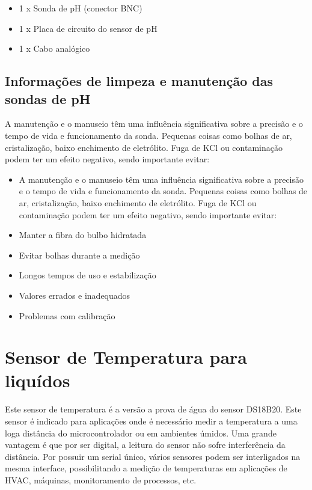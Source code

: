 \begin{itemize}
	\item 1 x Sonda de pH (conector BNC)
	\item 1 x Placa de circuito do sensor de pH
	\item 1 x Cabo analógico
\end{itemize}

\subsection{Informações de limpeza e manutenção das sondas de pH}

A manutenção e o manuseio têm uma influência significativa sobre a precisão e o tempo de vida
e funcionamento da sonda. Pequenas coisas como bolhas de ar, cristalização, baixo enchimento de
eletrólito. Fuga de KCl ou contaminação podem ter um efeito negativo, sendo importante evitar:

\begin{itemize}
	\item A manutenção e o manuseio têm uma influência significativa sobre a precisão e o tempo de vida
	e funcionamento da sonda. Pequenas coisas como bolhas de ar, cristalização, baixo enchimento de
	eletrólito. Fuga de KCl ou contaminação podem ter um efeito negativo, sendo importante evitar:
	\item Manter a fibra do bulbo hidratada
	\item Evitar bolhas durante a medição
	\item Longos tempos de uso e estabilização
	\item Valores errados e inadequados
	\item Problemas com calibração
\end{itemize}

\section{Sensor de Temperatura para liquídos}

Este sensor de temperatura é a versão a prova de água do sensor DS18B20. Este sensor é indicado
para aplicações onde é necessário medir a temperatura a uma loga distância do microcontrolador
ou em ambientes úmidos. Uma grande vantagem é que por ser digital, a leitura do sensor não sofre
interferência da distância. Por possuir um serial único, vários sensores podem ser interligados na
mesma interface, possibilitando a medição de temperaturas em aplicações de HVAC, máquinas, monitoramento de processos, etc.


